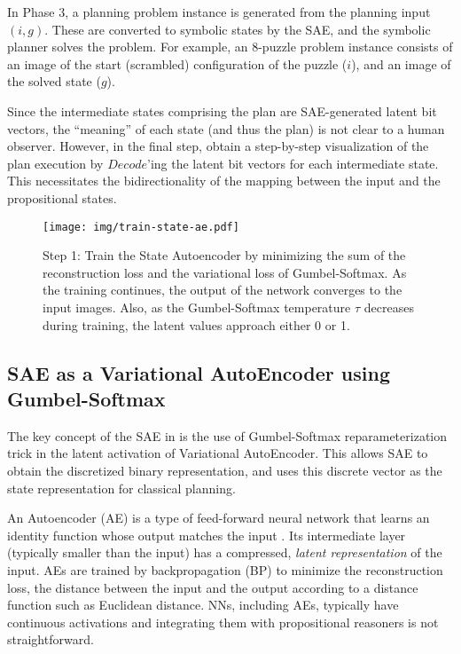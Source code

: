 In Phase 3, a planning problem instance is generated from the planning input $(i,g)$.
These are converted to symbolic states by the SAE, and the symbolic planner solves the problem.
For example, an 8-puzzle problem instance consists of an image of the start (scrambled) configuration of the puzzle ($i$), and an image of the solved state ($g$).

Since the intermediate states comprising the plan are SAE-generated latent bit vectors, the ``meaning'' of each state (and thus the plan) is not clear to a human observer.
However, in the final step, \latentplanner obtain a step-by-step visualization of the plan execution
by $Decode$'ing the latent bit vectors for each intermediate state.
This necessitates the bidirectionality of the mapping between the input and the propositional states.

\begin{figure}[htb]
 \texttt{[image: img/train-state-ae.pdf]}
 \caption{Step 1:
Train the State Autoencoder by
 minimizing the sum of the reconstruction loss and the variational loss of Gumbel-Softmax.
As the training continues, the output of the network converges to the input images.
Also, as the Gumbel-Softmax temperature $\tau$ decreases during training,
the latent values approach either 0 or 1.}
 \label{sae}
\end{figure}

\subsection{SAE as a Variational AutoEncoder using Gumbel-Softmax}

The key concept of the SAE in \latentplanner is the use of Gumbel-Softmax \cite{jang2016categorical}
reparameterization trick in the latent activation of Variational AutoEncoder.
This allows SAE to obtain the
discretized binary representation, and \latentplanner uses this
discrete vector as the state representation for classical planning.

An Autoencoder (AE) is a type of feed-forward neural network that learns an identity function whose output matches the input \cite{hinton2006reducing}.
Its intermediate layer (typically smaller than the input) has a compressed, \emph{latent representation} of the input.
AEs are trained by backpropagation (BP) to minimize the reconstruction loss, the distance between the input and the output according to a distance function such as Euclidean distance.
NNs, including AEs, typically have continuous activations and integrating them with propositional reasoners is not straightforward.

